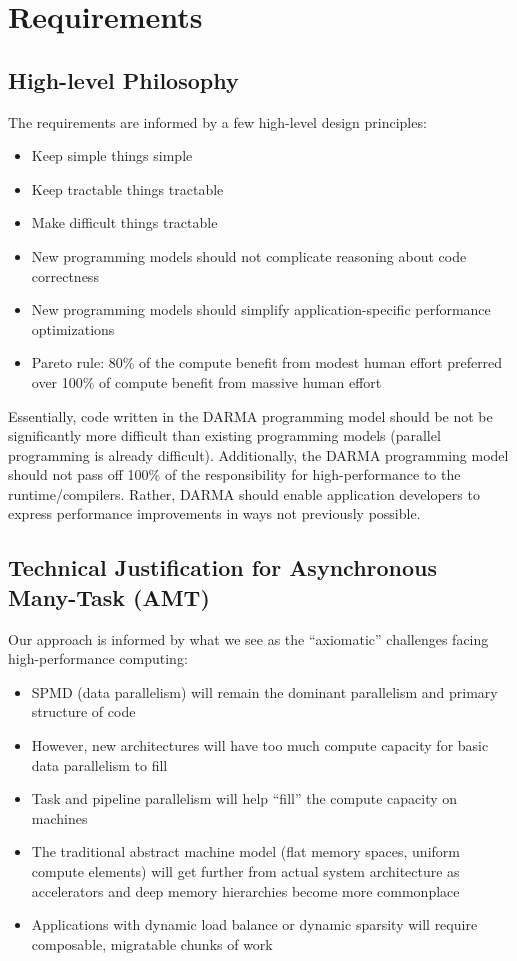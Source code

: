 
\chapter{Requirements} 
\label{chap:requirements} 
\section{High-level Philosophy}
The requirements are informed by a few high-level design principles:
\begin{itemize}
\item Keep simple things simple
\item Keep tractable things tractable
\item Make difficult things tractable
\item New programming models should not complicate reasoning about code correctness
\item New programming models should simplify application-specific performance optimizations
\item Pareto rule: 80\% of the compute benefit from modest human effort preferred over 100\% of compute benefit from massive human effort
\end{itemize}
Essentially, code written in the DARMA programming model should be not be significantly more difficult than existing programming models (parallel programming is already difficult).
Additionally, the DARMA programming model should not pass off 100\% of the responsibility for high-performance to the runtime/compilers.
Rather, DARMA should enable application developers to express performance improvements in ways not previously possible.

\section{Technical Justification for Asynchronous Many-Task (AMT)}
Our approach is informed by what we see as the ``axiomatic'' challenges facing high-performance computing:
\begin{itemize}
\item SPMD (data parallelism) will remain the dominant parallelism and primary structure of code
\item However, new architectures will have too much compute capacity for basic data parallelism to fill
\item Task and pipeline parallelism will help ``fill'' the compute capacity on machines
\item The traditional abstract machine model (flat memory spaces, uniform compute elements) will get further from actual system architecture as accelerators and deep memory hierarchies become more commonplace
\item Applications with dynamic load balance or dynamic sparsity will require composable, migratable chunks of work
\end{itemize}

